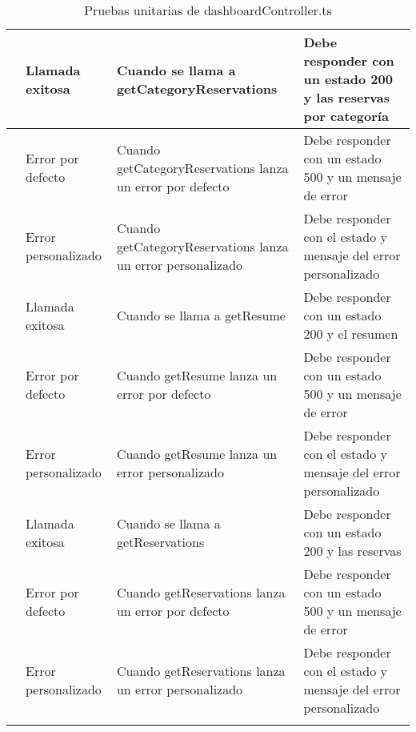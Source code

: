 \begin{small}
\begin{longtable}[H]{|>{\centering\arraybackslash}m{3cm}|>{\centering\arraybackslash}m{2cm}|>{\centering\arraybackslash}m{3cm}|>{\centering\arraybackslash}m{4cm}|}
		\multirow{3}{3cm}{GET /categoryReservations}
		                 & Llamada exitosa       & Cuando se llama a getCategoryReservations                   & Debe responder con un estado 200 y las reservas por categoría  \\
		\cline{2-4}
		                 & Error por defecto     & Cuando getCategoryReservations lanza un error por defecto   & Debe responder con un estado 500 y un mensaje de error         \\
		\cline{2-4}
		                 & Error personalizado   & Cuando getCategoryReservations lanza un error personalizado & Debe responder con el estado y mensaje del error personalizado \\
		\hline

		\multirow{3}{3cm}{GET /resume}
		                 & Llamada exitosa       & Cuando se llama a getResume                                 & Debe responder con un estado 200 y el resumen                  \\
		\cline{2-4}
		                 & Error por defecto     & Cuando getResume lanza un error por defecto                 & Debe responder con un estado 500 y un mensaje de error         \\
		\cline{2-4}
		                 & Error personalizado   & Cuando getResume lanza un error personalizado               & Debe responder con el estado y mensaje del error personalizado \\
		\hline

		\multirow{3}{3cm}{GET /reservations}
		                 & Llamada exitosa       & Cuando se llama a getReservations                           & Debe responder con un estado 200 y las reservas                \\
		\cline{2-4}
		                 & Error por defecto     & Cuando getReservations lanza un error por defecto           & Debe responder con un estado 500 y un mensaje de error         \\
		\cline{2-4}
		                 & Error personalizado   & Cuando getReservations lanza un error personalizado         & Debe responder con el estado y mensaje del error personalizado \\
		\hline
		\caption{Pruebas unitarias de dashboardController.ts}
	\end{longtable}
\end{small}

